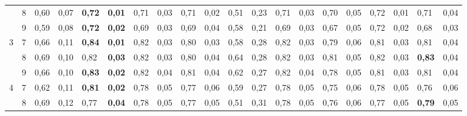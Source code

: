 \documentclass[conference]{IEEEtran}
\begin{document}
\begin{table*}[]
\begin{tabular}{|cl|ll|ll|ll|ll|ll|ll|ll|ll|ll|}
		\multicolumn{1}{|c|}{} & 8 & \multicolumn{1}{l|}{0,60} & 0,07 & \multicolumn{1}{l|}{\textbf{0,72}} & \textbf{0,01} & \multicolumn{1}{l|}{0,71} & 0,03 & \multicolumn{1}{l|}{0,71} & 0,02 & \multicolumn{1}{l|}{0,51} & 0,23 & \multicolumn{1}{l|}{0,71} & 0,03 & \multicolumn{1}{l|}{0,70} & 0,05 & \multicolumn{1}{l|}{0,72} & 0,01 & \multicolumn{1}{l|}{0,71} & 0,04 \\ \cline{2-20} 
		\multicolumn{1}{|c|}{} & 9 & \multicolumn{1}{l|}{0,59} & 0,08 & \multicolumn{1}{l|}{\textbf{0,72}} & \textbf{0,02} & \multicolumn{1}{l|}{0,69} & 0,03 & \multicolumn{1}{l|}{0,69} & 0,04 & \multicolumn{1}{l|}{0,58} & 0,21 & \multicolumn{1}{l|}{0,69} & 0,03 & \multicolumn{1}{l|}{0,67} & 0,05 & \multicolumn{1}{l|}{0,72} & 0,02 & \multicolumn{1}{l|}{0,68} & 0,03 \\ \hline
		\multicolumn{1}{|c|}{\multirow{3}{*}{3}} & 7 & \multicolumn{1}{l|}{0,66} & 0,11 & \multicolumn{1}{l|}{\textbf{0,84}} & \textbf{0,01} & \multicolumn{1}{l|}{0,82} & 0,03 & \multicolumn{1}{l|}{0,80} & 0,03 & \multicolumn{1}{l|}{0,58} & 0,28 & \multicolumn{1}{l|}{0,82} & 0,03 & \multicolumn{1}{l|}{0,79} & 0,06 & \multicolumn{1}{l|}{0,81} & 0,03 & \multicolumn{1}{l|}{0,81} & 0,04 \\ \cline{2-20} 
		\multicolumn{1}{|c|}{} & 8 & \multicolumn{1}{l|}{0,69} & 0,10 & \multicolumn{1}{l|}{0,82} & \textbf{0,03} & \multicolumn{1}{l|}{0,82} & 0,03 & \multicolumn{1}{l|}{0,80} & 0,04 & \multicolumn{1}{l|}{0,64} & 0,28 & \multicolumn{1}{l|}{0,82} & 0,03 & \multicolumn{1}{l|}{0,81} & 0,05 & \multicolumn{1}{l|}{0,82} & 0,03 & \multicolumn{1}{l|}{\textbf{0,83}} & 0,04 \\ \cline{2-20} 
		\multicolumn{1}{|c|}{} & 9 & \multicolumn{1}{l|}{0,66} & 0,10 & \multicolumn{1}{l|}{\textbf{0,83}} & \textbf{0,02} & \multicolumn{1}{l|}{0,82} & 0,04 & \multicolumn{1}{l|}{0,81} & 0,04 & \multicolumn{1}{l|}{0,62} & 0,27 & \multicolumn{1}{l|}{0,82} & 0,04 & \multicolumn{1}{l|}{0,78} & 0,05 & \multicolumn{1}{l|}{0,81} & 0,03 & \multicolumn{1}{l|}{0,81} & 0,04 \\ \hline
		\multicolumn{1}{|c|}{\multirow{3}{*}{4}} & 7 & \multicolumn{1}{l|}{0,62} & 0,11 & \multicolumn{1}{l|}{\textbf{0,81}} & \textbf{0,02} & \multicolumn{1}{l|}{0,78} & 0,05 & \multicolumn{1}{l|}{0,77} & 0,06 & \multicolumn{1}{l|}{0,59} & 0,27 & \multicolumn{1}{l|}{0,78} & 0,05 & \multicolumn{1}{l|}{0,75} & 0,06 & \multicolumn{1}{l|}{0,78} & 0,05 & \multicolumn{1}{l|}{0,76} & 0,06 \\ \cline{2-20} 
		\multicolumn{1}{|c|}{} & 8 & \multicolumn{1}{l|}{0,69} & 0,12 & \multicolumn{1}{l|}{0,77} & \textbf{0,04} & \multicolumn{1}{l|}{0,78} & 0,05 & \multicolumn{1}{l|}{0,77} & 0,05 & \multicolumn{1}{l|}{0,51} & 0,31 & \multicolumn{1}{l|}{0,78} & 0,05 & \multicolumn{1}{l|}{0,76} & 0,06 & \multicolumn{1}{l|}{0,77} & 0,05 & \multicolumn{1}{l|}{\textbf{0,79}} & 0,05 \\ \cline{2-20} 

\end{tabular}
\end{table*}
\end{document}
